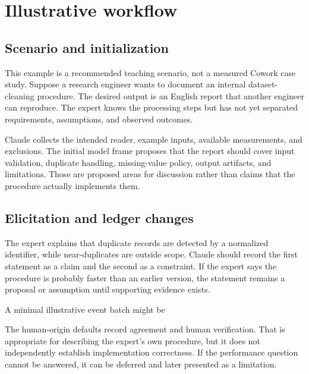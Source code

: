 \documentclass[12pt,a4paper]{article}
\begin{document}
\section{Illustrative workflow}
\subsection{Scenario and initialization}
This example is a recommended teaching scenario, not a measured Cowork case study. Suppose a research engineer wants to document an internal dataset-cleaning procedure. The desired output is an English report that another engineer can reproduce. The expert knows the processing steps but has not yet separated requirements, assumptions, and observed outcomes.

Claude collects the intended reader, example inputs, available measurements, and exclusions. The initial model frame proposes that the report should cover input validation, duplicate handling, missing-value policy, output artifacts, and limitations. Those are proposed areas for discussion rather than claims that the procedure actually implements them.

\subsection{Elicitation and ledger changes}
The expert explains that duplicate records are detected by a normalized identifier, while near-duplicates are outside scope. Claude should record the first statement as a claim and the second as a constraint. If the expert says the procedure is probably faster than an earlier version, the statement remains a proposal or assumption until supporting evidence exists.

A minimal illustrative event batch might be
\begin{Code}
\end{Code}
The human-origin defaults record agreement and human verification. That is appropriate for describing the expert's own procedure, but it does not independently establish implementation correctness. If the performance question cannot be answered, it can be deferred and later presented as a limitation.
\end{document}
